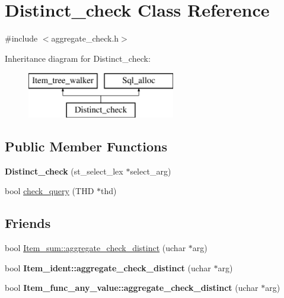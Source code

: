 \hypertarget{classDistinct__check}{}\section{Distinct\+\_\+check Class Reference}
\label{classDistinct__check}


{\ttfamily \#include $<$aggregate\+\_\+check.\+h$>$}

Inheritance diagram for Distinct\+\_\+check\+:\begin{figure}[H]
\begin{center}
\leavevmode
\includegraphics[height=2.000000cm]{classDistinct__check}
\end{center}
\end{figure}
\subsection*{Public Member Functions}
\begin{DoxyCompactItemize}
\item 
\mbox{\label{classDistinct__check_a86242898503a8f66b84d47d3cb6b9abf}} 
{\bfseries Distinct\+\_\+check} (st\+\_\+select\+\_\+lex $\ast$select\+\_\+arg)
\item 
bool \mbox{\hyperlink{group__AGGREGATE__CHECKS_ga83e75b415b78e10ade375ad320ea446c}{check\+\_\+query}} (T\+HD $\ast$thd)
\end{DoxyCompactItemize}
\subsection*{Friends}
\begin{DoxyCompactItemize}
\item 
bool \mbox{\hyperlink{classDistinct__check_a428fcc2df9fde928311ae13c84f03bcc}{Item\+\_\+sum\+::aggregate\+\_\+check\+\_\+distinct}} (uchar $\ast$arg)
\item 
\mbox{\label{classDistinct__check_a0393446fee3e58f5293b667a13670b61}} 
bool {\bfseries Item\+\_\+ident\+::aggregate\+\_\+check\+\_\+distinct} (uchar $\ast$arg)
\item 
\mbox{\label{classDistinct__check_a7afbe3195aa38f18eba80a8cfd419d87}} 
bool {\bfseries Item\+\_\+func\+\_\+any\+\_\+value\+::aggregate\+\_\+check\+\_\+distinct} (uchar $\ast$arg)
\end{DoxyCompactItemize}
